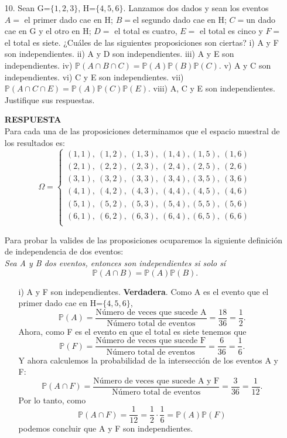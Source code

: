\documentclass[11pt,letterpaper]{article}
\newcommand{\mP}{\mathbb{P}}
\newcommand{\res}{\textbf{RESPUESTA}\\}
\begin{document}
\begin{itemize}
\item[10.] Sean G=$\{1, 2, 3\}$, H=$\{4, 5, 6\}$. Lanzamos dos dados y sean los eventos $A=$ el primer dado cae en H; $B=$el segundo dado cae en H; $C=$un dado cae en G y el otro en H; $D=$ el total es cuatro, $E=$ el total es cinco y $F=$ el total es siete. ¿Cuáles de las siguientes proposiciones son ciertas? i) A y F son independientes. ii) A y D son independientes. iii) A
y E son independientes. iv) $\mP(A \cap B \cap C) = \mP (A)\mP (B)\mP (C)$. v) A y C son independientes.
vi) C y E son independientes. vii) $\mP (A \cap C \cap E) = \mP (A)\mP (C)\mP (E)$. viii) A, C y E son
independientes. Justifique sus respuestas.

\res

Para cada una de las proposiciones determinamos que el espacio muestral de los resultados es:
\begin{equation*}
\Omega=\left\{ \begin{array}{c}
 (1,1),\ (1,2), \ (1,3),\ (1,4), (1,5),\ (1,6)\\
 (2,1),\ (2,2), \ (2,3),\ (2,4), (2,5),\ (2,6)\\
 (3,1),\ (3,2), \ (3,3),\ (3,4), (3,5),\ (3,6)\\
 (4,1),\ (4,2), \ (4,3),\ (4,4), (4,5),\ (4,6)\\
 (5,1),\ (5,2), \ (5,3),\ (5,4), (5,5),\ (5,6)\\
 (6,1),\ (6,2), \ (6,3),\ (6,4), (6,5),\ (6,6)\\
\end{array}\right.
\end{equation*}

Para probar la valides de las proposiciones ocuparemos la siguiente definición de independencia de dos eventos: \\

\textit{Sea A y B dos eventos, entonces son independientes si solo sí}
$$\mP(A\cap B)=\mP(A)\mP(B).$$

\begin{itemize}
\item[i)] A y F son independientes. \textbf{Verdadera}. Como A es el evento que el primer dado cae en H=$\{4, 5, 6\}$, 
$$\mP(A)=\frac{\text{Número de veces que sucede A}}{\text{Número total de eventos}}= \frac{18}{36}=\frac{1}{2}.$$
Ahora, como F es el evento en que el total es siete tenemos que
$$\mP(F)=\frac{\text{Número de veces que sucede F}}{\text{Número total de eventos}}=\frac{6}{36}=\frac{1}{6}.$$
Y ahora calculemos la probabilidad de la intersección de los eventos A y F:
$$\mP(A\cap F)= \frac{\text{Número de veces que sucede A y F}}{\text{Número total de eventos}}=\frac{3}{36}=\frac{1}{12}.$$
Por lo tanto, como
$$\mP(A\cap F)= \frac{1}{12}=\frac{1}{2}\cdot \frac{1}{6}=\mP(A)\mP(F)$$
podemos concluir que A y F son independientes.


\end{itemize}
\end{itemize}
\end{document}
